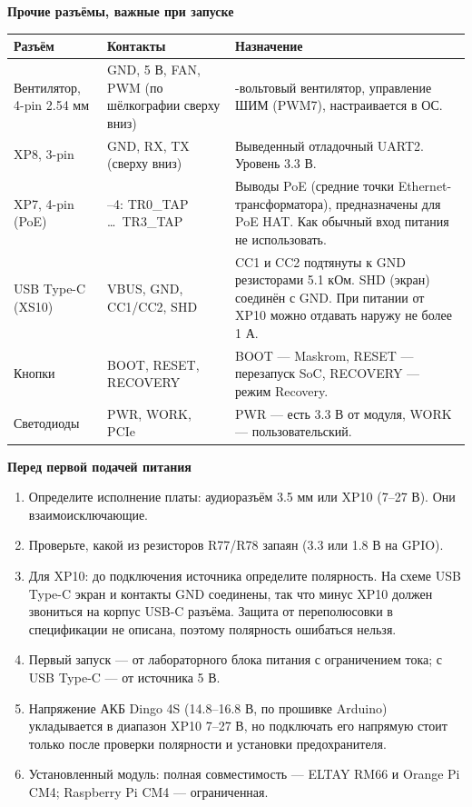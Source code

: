 \documentclass[10pt,a4paper]{article}
\begin{document}
\newpage
{\large\bfseries Прочие разъёмы, важные при запуске}\\[4pt]
\footnotesize
\begin{tabular}{@{}>{\raggedright\arraybackslash}p{3.4cm} >{\raggedright\arraybackslash}p{3.6cm} >{\raggedright\arraybackslash}p{10.6cm}@{}}
\toprule
Разъём & Контакты & Назначение \\
\midrule
Вентилятор, 4-pin 2.54 мм & GND, 5 В, FAN, PWM (по шёлкографии сверху вниз) & 5-вольтовый вентилятор, управление ШИМ (PWM7), настраивается в ОС. \\
XP8, 3-pin & GND, RX, TX (сверху вниз) & Выведенный отладочный UART2. Уровень 3.3 В. \\
XP7, 4-pin (PoE) & 1--4: TR0\_TAP \ldots\ TR3\_TAP & Выводы PoE (средние точки Ethernet-трансформатора), предназначены для PoE HAT. Как обычный вход питания не использовать. \\
USB Type-C (XS10) & VBUS, GND, CC1/CC2, SHD & CC1 и CC2 подтянуты к GND резисторами 5.1 кОм. SHD (экран) соединён с GND. При питании от XP10 можно отдавать наружу не более 1 А. \\
Кнопки & BOOT, RESET, RECOVERY & BOOT --- Maskrom, RESET --- перезапуск SoC, RECOVERY --- режим Recovery. \\
Светодиоды & PWR, WORK, PCIe & PWR --- есть 3.3 В от модуля, WORK --- пользовательский. \\
\bottomrule
\end{tabular}

\vspace{8pt}
{\large\bfseries Перед первой подачей питания}\\[3pt]
\footnotesize
\begin{enumerate}\setlength\itemsep{1pt}
\item Определите исполнение платы: аудиоразъём 3.5 мм или XP10 (7--27 В). Они взаимоисключающие.
\item Проверьте, какой из резисторов R77/R78 запаян (3.3 или 1.8 В на GPIO).
\item Для XP10: до подключения источника определите полярность. На схеме USB Type-C экран и контакты GND соединены, так что минус XP10 должен звониться на корпус USB-C разъёма. Защита от переполюсовки в спецификации не описана, поэтому полярность ошибаться нельзя.
\item Первый запуск --- от лабораторного блока питания с ограничением тока; с USB Type-C --- от источника 5 В.
\item Напряжение АКБ Dingo 4S (14.8--16.8 В, по прошивке Arduino) укладывается в диапазон XP10 7--27 В, но подключать его напрямую стоит только после проверки полярности и установки предохранителя.
\item Установленный модуль: полная совместимость --- ELTAY RM66 и Orange Pi CM4; Raspberry Pi CM4 --- ограниченная.
\end{enumerate}
\end{document}
